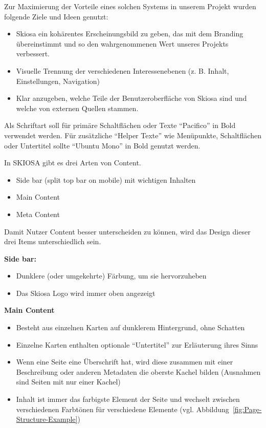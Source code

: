 Zur Maximierung der Vorteile eines solchen Systems in unserem Projekt wurden folgende Ziele und Ideen genutzt:
\begin{itemize}
    \item Skiosa ein kohärentes Erscheinungsbild zu geben, das mit dem Branding übereinstimmt und so den wahrgenommenen Wert unseres Projekts verbessert.
    \item Visuelle Trennung der verschiedenen Interessenebenen (z. B. Inhalt, Einstellungen, Navigation)
    \item Klar anzugeben, welche Teile der Benutzeroberfläche von Skiosa sind und welche von externen Quellen stammen.
\end{itemize}

Als Schriftart soll für primäre Schaltflächen oder Texte \enquote{Pacifico} in Bold verwendet werden.
Für zusätzliche \enquote{Helper Texte} wie Menüpunkte, Schaltflächen oder Untertitel sollte \enquote{Ubuntu Mono} in Bold genutzt werden.

In SKIOSA gibt es drei Arten von Content.  
\begin{itemize}
    \item Side bar (split top bar on mobile) mit wichtigen Inhalten
    \item Main Content
    \item Meta Content
\end{itemize}

Damit Nutzer Content besser unterscheiden zu können, wird das Design dieser drei Items unterschiedlich sein.

\textbf{Side bar:}
\begin{itemize}
    \item Dunklere (oder umgekehrte) Färbung, um sie hervorzuheben
    \item Das Skiosa Logo wird immer oben angezeigt
\end{itemize}

\textbf{Main Content}
\begin{itemize}
    \item Besteht aus einzelnen Karten auf dunklerem Hintergrund, ohne Schatten
    \item Einzelne Karten enthalten optionale \enquote{Untertitel} zur Erläuterung ihres Sinns
    \item Wenn eine Seite eine Überschrift hat, wird diese zusammen mit einer Beschreibung oder anderen Metadaten die oberste Kachel bilden (Ausnahmen sind Seiten mit nur einer Kachel)
    \item Inhalt ist immer das farbigste Element der Seite und wechselt zwischen verschiedenen Farbtönen für verschiedene Elemente (vgl. Abbildung~\ref{fig:Page-Structure-Example})
\end{itemize}

